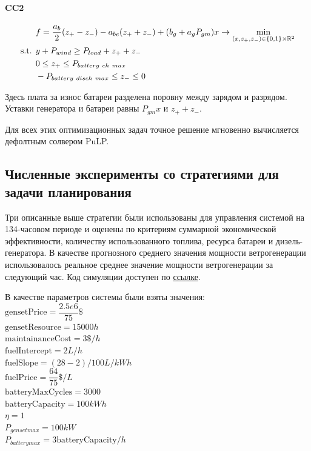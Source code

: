 \paragraph{CC2}

\begin{equation}\label{f:cc2}
\begin{split}
&f = \frac{a_b}{2}(z_+ - z_-) - a_{be}(z_+ + z_-)
+ (b_g  + a_g P_{gm}) x
\rightarrow \min\limits_{(x, z_+, z_-) \in \{0,1\} \times \mathbb{R}^2 }\\
\text{s.t. }& y + P_{wind} \geq P_{load} + z_+ + z_-\\
&0 \leq z_+ \leq P_{battery~ch~max} \\
&-P_{battery~disch~max} \leq z_- \leq 0 \\
\end{split}
\end{equation}


Здесь плата за износ батареи разделена поровну между зарядом и разрядом.
Уставки генератора и батареи равны $P_{gm}x$ и $z_+ + z_-$.

\medskip
Для всех этих оптимизационных задач точное решение мгновенно вычисляется дефолтным солвером PuLP.

\subsection{Численные эксперименты со стратегиями для задачи планирования}
\label{sec:planning_numeric}

Три описанные выше стратегии были использованы для управления системой на 134-часовом периоде и оценены по критериям суммарной экономической эффективности, количеству использованного топлива,  ресурса батареи и дизель-генератора.
В качестве прогнозного среднего значения мощности ветрогенерации использовалось реальное среднее значение мощности ветрогенерации за следующий час. 
Код симуляции доступен по \href{https://github.com/niquepolice/electro/blob/03f136b13663806bfba4a4ce973f524558564363/milp.ipynb}{ссылке}.

В качестве параметров системы были взяты значения:\\
$\text{gensetPrice} = \dfrac{2.5e6}{75}\$$\\
$\text{gensetResource} = 15000h$\\
$\text{maintainanceCost} = 3\$/h$\\
$\text{fuelIntercept} = 2L/h$\\
$\text{fuelSlope} = (28-2)/100 L/kWh$\\
$\text{fuelPrice} = \dfrac{64}{75}\$/L$\\
$\text{batteryMaxCycles} = 3000$\\
$\text{batteryCapacity} = 100kWh$\\
$\eta = 1$ \\
$P_{genset max} = 100kW$ \\
$P_{battery max} = 3\text{batteryCapacity} / h$

